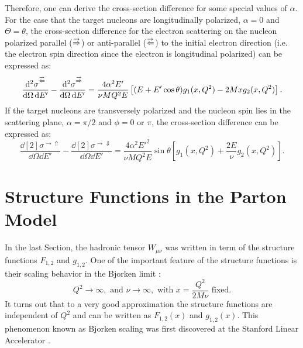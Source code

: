 Therefore, one can derive the cross-section difference for some special values of $\alpha$. For the case that the target nucleons are longitudinally polarized, $\alpha=0$ and $\Theta=\theta$, the cross-section difference for the electron scattering on the nucleon polarized parallel ($\buildrel\rightarrow\over\Rightarrow$) or anti-parallel ($\buildrel\rightarrow\over\Leftarrow$) to the initial electron direction (i.e. the electron spin direction since the electron is longitudinal polarized) can be expressed as:
\begin{equation} \label{C2S2E25}
\frac{\dd[2]{\sigma}^{\buildrel\rightarrow\over\Leftarrow}}{\dd{\Omega}\dd{E'}}-\frac{\dd[2]{\sigma}^{\buildrel\rightarrow\over\Rightarrow}}{\dd{\Omega}\dd{E'}}=\frac{4\alpha^2E'}{\nu MQ^2E}\left[(E+E'\cos\theta)g_1(x,Q^2)-2Mxg_2(x,Q^2)\right].
\end{equation}
If the target nucleons are transversely polarized and the nucleon spin lies in the scattering plane, $\alpha=\pi/2$ and $\phi=0$ or $\pi$, the cross-section difference can be expressed as:
\begin{equation} \label{C2S2E26}
\frac{\dd[2]{\sigma}^{\rightarrow\Uparrow}}{\dd{\Omega}\dd{E'}}-\frac{\dd[2]{\sigma}^{\rightarrow\Downarrow}}{\dd{\Omega}\dd{E'}}=\frac{4\alpha^2E'^2}{\nu MQ^2E}\sin\theta\left[g_1(x,Q^2)+\frac{2E}{\nu}g_2(x,Q^2)\right].
\end{equation}

\section{Structure Functions in the Parton Model}
\label{C2S3}

In the last Section, the hadronic tensor $W_{\mu\nu}$ was written in term of the structure functions $F_{1,2}$ and $g_{1,2}$. One of the important feature of the structure functions is their scaling behavior in the Bjorken limit \cite{Bjorken1969}:
\begin{equation} \label{C2S3E1}
Q^2\to\infty, \text{ and } \nu\to\infty, \text{ with } x=\frac{Q^2}{2M\nu} \text{ fixed}.
\end{equation}
It turns out that to a very good approximation the structure functions are independent of $Q^2$ and can be written as $F_{1,2}(x)$ and $g_{1,2}(x)$. This phenomenon known as Bjorken scaling was first discovered at the Stanford Linear Accelerator \cite{Kendall1991}.

